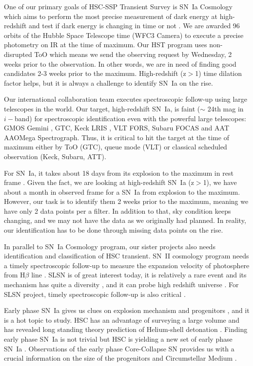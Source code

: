 \documentclass[proof]{pasj01}
\begin{document}
One of our primary goals of HSC-SSP Transient Survey is SN~Ia Cosmology which aims to perform the most precise measurement of dark energy at high-redshift and test if dark energy is changing in time or not \citep{linder03b}.
We are awarded 96 orbits of the Hubble Space Telescope time (WFC3 Camera) to execute a precise photometry on IR at the time of maximum.
Our HST program uses non-disrupted ToO which means we send the observing request by Wednesday, 2 weeks prior to the observation.
In other words, we are in need of finding good candidates 2-3 weeks prior to the maximum.  High-redshift (z$>$1) time dilation factor helps, but it is always a challenge to identify SN~Ia on the rise.

Our international collaboration team executes spectroscopic follow-up using large telescopes in the world.  
Our target, high-redshift SN~Ia, is faint ($\sim$ 24th mag in $i-$band) for spectroscopic identification even with the powerful large telescopes: GMOS Gemini \citep{hook04a}, GTC, Keck LRIS \citep{oke95a}, VLT FORS, Subaru FOCAS \citep{kashikawa02a} and AAT AAOMega Spectrograph.  
Thus, it is critical to hit the target at the time of maximum either by ToO (GTC), queue mode (VLT) or classical scheduled observation (Keck, Subaru, ATT).

For SN~Ia, it takes about 18 days from its explosion to the maximum in rest frame \citep{conley06a,papadogiannakis19a}.   Given the fact, we are looking at high-redshift SN~Ia (z$>$1), we have about a month in observed frame for a SN~Ia from explosion to the maximum.   However, our task is to identify them 2 weeks prior to the maximum, meaning we have only 2 data points per a filter.   In addition to that, sky condition keeps changing, and we may not have the data as we originally had planned.   In reality, our identification has to be done through missing data points on the rise.

In parallel to SN~Ia Cosmology program, our sister projects also needs identification and classification of HSC transient.   
SN~II cosmology program needs a timely spectroscopic follow-up to measure the expansion velocity of photosphere from H$\beta$ line \citep{dejaeger17a}.
SLSN is of great interest today, it is relatively a rare event\citep{quimby11a} and its mechanism has quite a diversity \citep{galyam12a,Moriya18SLSN}, and it can probe high redshift universe \citep{cooke12a}.    
For SLSN project, timely spectroscopic follow-up is also critical \citep{moriya19a,curtin19a}.

Early phase SN~Ia gives us clues on explosion mechanism \citep{maeda18a} and progenitors \citep{cao15a}, and it is a hot topic to study.
HSC has an advantage of surveying a large volume and has revealed long standing theory prediction of Helium-shell detonation \citep{Jiang2017}.
Finding early phase SN~Ia is not trivial but HSC is yielding a new set of early phase SN~Ia \citep{Jiang_2020}.
Observations of the early phase Core-Collapse SN provides us with a crucial information on the size of the progenitors \citep{thompson03a,tominaga11a} and Circumstellar Medium \citep{forster18a}.  
\end{document}
